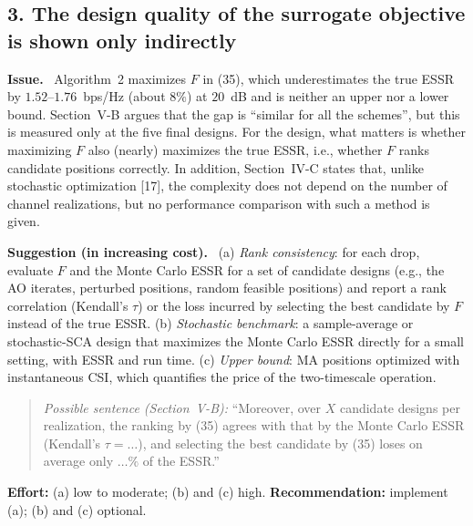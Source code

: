 \documentclass[10.5pt,a4paper]{article}
\newcommand{\Major}{\textcolor{BrickRed}{\textbf{Major}}}
\newcommand{\comment}[3]{\subsection*{#1}\vspace{-4pt}{\small Severity: #2\qquad Category: #3}\par}
\newenvironment{field}[1]{\par\smallskip\textbf{#1}\ }{\par}
\newenvironment{example}{\begin{quote}\small}{\end{quote}}
\begin{document}
\comment{3. The design quality of the surrogate objective is shown only indirectly}{\Major}{Methodology}
\begin{field}{Issue.}
Algorithm~2 maximizes $F$ in (35), which underestimates the true ESSR by $1.52$--$1.76$~bps/Hz (about $8\%$) at $20$~dB and is neither an upper nor a lower bound. Section~V-B argues that the gap is ``similar for all the schemes'', but this is measured only at the five final designs. For the design, what matters is whether maximizing $F$ also (nearly) maximizes the true ESSR, i.e., whether $F$ ranks candidate positions correctly. In addition, Section~IV-C states that, unlike stochastic optimization [17], the complexity does not depend on the number of channel realizations, but no performance comparison with such a method is given.
\end{field}
\begin{field}{Suggestion (in increasing cost).}
(a) \emph{Rank consistency}: for each drop, evaluate $F$ and the Monte Carlo ESSR for a set of candidate designs (e.g., the AO iterates, perturbed positions, random feasible positions) and report a rank correlation (Kendall's $\tau$) or the loss incurred by selecting the best candidate by $F$ instead of the true ESSR. (b) \emph{Stochastic benchmark}: a sample-average or stochastic-SCA design that maximizes the Monte Carlo ESSR directly for a small setting, with ESSR and run time. (c) \emph{Upper bound}: MA positions optimized with instantaneous CSI, which quantifies the price of the two-timescale operation.
\end{field}
\begin{example}
\textit{Possible sentence (Section~V-B):} ``Moreover, over $X$ candidate designs per realization, the ranking by (35) agrees with that by the Monte Carlo ESSR (Kendall's $\tau=\ldots$), and selecting the best candidate by (35) loses on average only $\ldots\%$ of the ESSR.''
\end{example}
\textbf{Effort:} (a) low to moderate; (b) and (c) high. \textbf{Recommendation:} implement (a); (b) and (c) optional.
\end{document}
